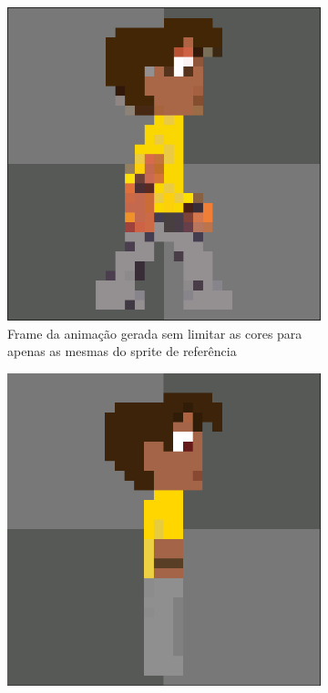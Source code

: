 \begin{figure}[htbp]
    \begin{subfigure}{0.32\linewidth}
        \includegraphics[width=1\linewidth]{figs/pixelLab/dia4/print1.PNG}
        \caption{\small Frame da animação gerada sem limitar as cores para apenas as mesmas do sprite de referência}
        \label{fig:pixelLabAnimaComparaGeminiAni2}
    \end{subfigure}
    \begin{subfigure}{0.32\linewidth}
        \includegraphics[width=1\linewidth]{figs/pixelLab/dia3/fix_oficial_fundo_igual.PNG}

\end{subfigure}
\end{figure}
